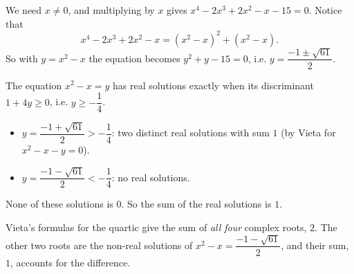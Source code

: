 We need $x\ne0$, and multiplying by $x$ gives $x^4-2x^3+2x^2-x-15=0$. Notice that
\[x^4-2x^3+2x^2-x=\left(x^2-x\right)^2+\left(x^2-x\right).\]
So with $y=x^2-x$ the equation becomes $y^2+y-15=0$, i.e. $y=\dfrac{-1\pm\sqrt{61}}{2}$.

The equation $x^2-x=y$ has real solutions exactly when its discriminant $1+4y\ge0$, i.e. $y\ge-\dfrac14$.
\begin{itemize}
\item $y=\dfrac{-1+\sqrt{61}}{2}>-\dfrac14$: two distinct real solutions with sum $1$ (by Vieta for $x^2-x-y=0$).
\item $y=\dfrac{-1-\sqrt{61}}{2}<-\dfrac14$: no real solutions.
\end{itemize}
None of these solutions is $0$. So the sum of the real solutions is $\boxed{1}$.

Vieta's formulas for the quartic give the sum of \emph{all four} complex roots, $2$. The other two roots are the non-real solutions of $x^2-x=\dfrac{-1-\sqrt{61}}{2}$, and their sum, $1$, accounts for the difference.
